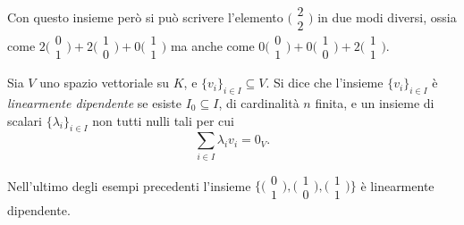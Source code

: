 \begin{itemize}
		Con questo insieme però si può scrivere l'elemento $\big(\begin{smallmatrix} 2\\2 \end{smallmatrix}\big)$ in due modi diversi, ossia come $2\big(\begin{smallmatrix} 0\\1 \end{smallmatrix}\big)+2\big(\begin{smallmatrix} 1\\0 \end{smallmatrix}\big)+0\big(\begin{smallmatrix} 1\\1 \end{smallmatrix}\big)$ ma anche come $0\big(\begin{smallmatrix} 0\\1 \end{smallmatrix}\big)+0\big(\begin{smallmatrix} 1\\0 \end{smallmatrix}\big)+2\big(\begin{smallmatrix} 1\\1 \end{smallmatrix}\big)$.
\end{itemize}

\begin{definizione} \label{d:dipendenza-lineare}
	Sia $V$ uno spazio vettoriale su $K$, e $\{v_i\}_{i\in I}\subseteq V$.
	Si dice che l'insieme $\{v_i\}_{i\in I}$ è \emph{linearmente dipendente} se esiste $I_0\subseteq I$, di cardinalità $n$ finita, e un insieme di scalari $\{\lambda_i\}_{i\in I}$ non tutti nulli tali per cui
	\begin{equation*}
		\sum_{i\in I}\lambda_i v_i=0_V.
	\end{equation*}
\end{definizione}
Nell'ultimo degli esempi precedenti l'insieme $\big\{\big(\begin{smallmatrix} 0\\1 \end{smallmatrix}\big),\big(\begin{smallmatrix} 1\\0 \end{smallmatrix}\big),\big(\begin{smallmatrix} 1\\1 \end{smallmatrix}\big)\big\}$ è linearmente dipendente.

